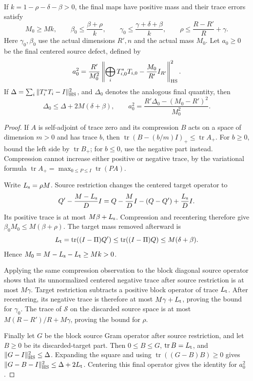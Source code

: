 \begin{lemma}
\label{shared-trace-restriction}
If \(k=1-\rho-\delta-\beta>0\), the final maps have positive mass
and their trace errors satisfy
\begin{equation}\label{shared-trace-restriction-bound}
 M_0\ge Mk,\qquad
 \beta_0\le\frac{\beta+\rho}{k},\qquad
 \gamma_0\le\frac{\gamma+\delta+\beta}{k},\qquad
 \rho\le\frac{R-R'}R+\gamma.
\end{equation}
Here \(\gamma_0,\beta_0\) use the actual dimensions \(R',n\)
and the actual mass \(M_0\).
Let \(a_0\ge0\) be the final centered source defect, defined by
\[
 a_0^2=\frac{R'}{M_0^2}
 \left\|\bigoplus_iT_{i,0}^*T_{i,0}-\frac{M_0}{R'}I_{R'}\right\|_{\rm HS}^2.
\]
If \(\Delta=\sum_i\|T_i^*T_i-I\|_{\rm HS}^2\), and \(\Delta_0\)
denotes the analogous final quantity, then
\[
 \Delta_0\le\Delta+2M(\delta+\beta),\qquad
 a_0^2=\frac{R'\Delta_0-(M_0-R')^2}{M_0^2}.
\]
\end{lemma}

\begin{proof}
If \(A\) is self-adjoint of trace zero and its compression \(B\)
acts on a space of dimension \(m>0\) and has trace \(b\), then
\(\operatorname{tr}(B-(b/m)I)_+\le\operatorname{tr}A_+\).
For \(b\ge0\), bound the left side by \(\operatorname{tr}B_+\);
for \(b\le0\), use the negative part instead.
Compression cannot increase either positive or negative trace,
by the variational formula
\(\operatorname{tr}A_+=\max_{0\le P\le I}\operatorname{tr}(PA)\).

Write \(L_{\rm s}=\rho M\). Source restriction changes the centered
target operator to
\[
 Q'-\frac{M-L_{\rm s}}D I
  =Q-\frac MD I-(Q-Q')+\frac{L_{\rm s}}D I.
\]
Its positive trace is at most \(M\beta+L_{\rm s}\).
Compression and recentering therefore give
\(\beta_0M_0\le M(\beta+\rho)\).
The target mass removed afterward is
\[
 L_{\rm t}=\operatorname{tr}((I-\Pi)Q')
            \le\operatorname{tr}((I-\Pi)Q)
            \le M(\delta+\beta).
\]
Hence \(M_0=M-L_{\rm s}-L_{\rm t}\ge Mk>0\).

Applying the same compression observation to the block diagonal
source operator shows that its unnormalized centered negative
trace after source restriction is at most \(M\gamma\).
Target restriction subtracts a positive block operator of trace
\(L_{\rm t}\). After recentering, its negative trace is therefore
at most \(M\gamma+L_{\rm t}\), proving the bound for \(\gamma_0\).
The trace of \(\mathcal S\) on the discarded source space is at most
\(M(R-R')/R+M\gamma\), proving the bound for \(\rho\).

Finally let \(G\) be the block source Gram operator after source
restriction, and let \(B\ge0\) be its discarded-target part.
Then \(0\le B\le G\), \(\operatorname{tr}B=L_{\rm t}\), and
\(\|G-I\|_{\rm HS}^2\le\Delta\). Expanding the square and using
\(\operatorname{tr}((G-B)B)\ge0\) gives
\(\|G-B-I\|_{\rm HS}^2\le\Delta+2L_{\rm t}\).
Centering this final operator gives the identity for \(a_0^2\).
\end{proof}

